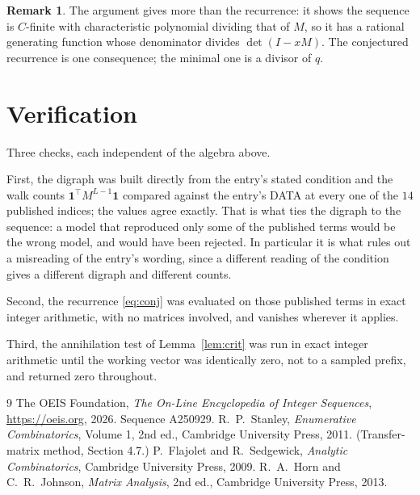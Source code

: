 \documentclass[11pt,a4paper]{article}
\theoremstyle{plain}
\theoremstyle{definition}
\newtheorem{remark}[theorem]{Remark}
\begin{document}
\begin{remark}
The argument gives more than the recurrence: it shows the sequence is $C$-finite with
characteristic polynomial dividing that of $M$, so it has a rational generating function
whose denominator divides $\det(I-xM)$. The conjectured recurrence is one consequence; the
minimal one is a divisor of $q$.
\end{remark}

\section{Verification}

Three checks, each independent of the algebra above.

First, the digraph was built directly from the entry's stated condition and the walk counts
$\mathbf{1}^{\!\top}M^{L-1}\mathbf{1}$ compared against the entry's DATA at
every one of the $14$ published indices; the values agree exactly. That is what ties
the digraph to the sequence: a model that reproduced only some of the published terms would
be the wrong model, and would have been rejected. In particular it is what rules out a
misreading of the entry's wording, since a different reading of the condition gives a
different digraph and different counts.

Second, the recurrence \eqref{eq:conj} was evaluated on those published terms in exact
integer arithmetic, with no matrices involved, and vanishes wherever it applies.

Third, the annihilation test of Lemma~\ref{lem:crit} was run in exact integer arithmetic
until the working vector was identically zero, not to a sampled prefix, and returned zero
throughout.

\begin{thebibliography}{9}
 The OEIS Foundation, \emph{The On-Line Encyclopedia of Integer
Sequences}, \url{https://oeis.org}, 2026. Sequence A250929.
 R.~P.~Stanley, \emph{Enumerative Combinatorics}, Volume 1, 2nd ed.,
Cambridge University Press, 2011. (Transfer-matrix method, Section 4.7.)
 P.~Flajolet and R.~Sedgewick, \emph{Analytic Combinatorics}, Cambridge
University Press, 2009.
 R.~A.~Horn and C.~R.~Johnson, \emph{Matrix Analysis}, 2nd ed., Cambridge
University Press, 2013.
\end{thebibliography}
\end{document}
